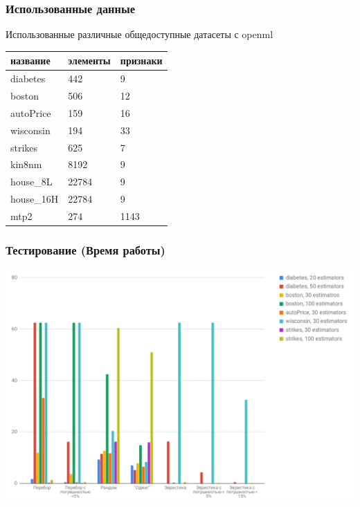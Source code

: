 \documentclass{beamer}
\begin{document}
\begin{frame}
    \frametitle{Использованные данные}
    Использованные различные общедоступные датасеты с openml
    \vfill
    \begin{center}
        \begin{tabular}{|l|l|l|}

        \hline

        название        & элементы  & признаки \\

        \hline

        diabetes        & 442    & 9     \\
        boston          & 506    & 12    \\
        autoPrice       & 159    & 16    \\
        wisconsin       & 194    & 33    \\
        strikes         & 625    & 7     \\
        kin8nm          & 8192   & 9     \\
        house\_8L       & 22784  & 9     \\
        house\_16H      & 22784  & 9     \\
        mtp2            & 274    & 1143  \\

        \hline

    \end{tabular}
    \end{center}
\end{frame}

\begin{frame}
    \frametitle{Тестирование (Время работы)}
    \begin{center}
    \includegraphics[width=\textwidth]{graph_time1.png}
    \end{center}
\end{frame}
\end{document}
